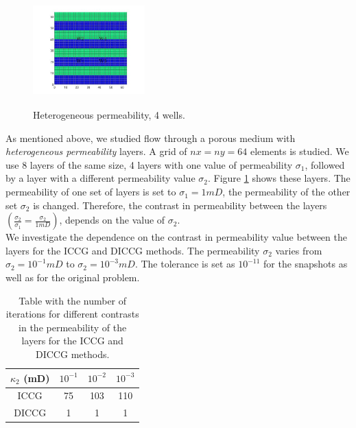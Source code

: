 \documentclass[12pt]{article}
\begin{document}
\begin{figure}
\centering 
\vspace{-10pt}
\includegraphics[width=4.3cm,height=4.3cm,keepaspectratio]{perm_he_1.jpg}
 \vspace{-20pt}
\caption{ Heterogeneous permeability, 4 wells.}\label{fig:hep}
\vspace{-15pt}
\end{figure}

\normalsize
As mentioned above, we studied flow through a porous medium with \emph{heterogeneous permeability} layers. A grid of
$nx = ny = 64$ elements is studied. We use 8 layers of the same size, 
4 layers with one value of permeability $\sigma_1$, followed by a layer with a different permeability value $\sigma_2$. Figure \ref{fig:hep} shows these layers. The permeability of one set of layers is set to $\sigma_1=1mD$, the permeability of the other set $\sigma_2$ is changed. 
Therefore, the contrast in permeability between the layers $(\frac{\sigma_2}{\sigma_1}=\frac{\sigma_2}{1mD})$,
depends on the value of $\sigma_2$.\\
We investigate the dependence on the contrast in permeability value between the layers for the ICCG and DICCG methods.
The permeability  $\sigma_2$ varies from $\sigma_2=10^{-1}mD$ to $\sigma_2=10^{-3}mD$. 
 The tolerance is set as $10^{-11}$ for the snapshots as well as for the original problem.\\
\renewcommand{\arraystretch}{1.3}
\begin{table}[!ht]\centering
\begin{minipage}{.65\textwidth}
\vspace{-20pt}
\centering
\begin{tabular}{ |c|c|c|c|} 
\hline
 $\kappa_2$ (mD) & $10^{-1}$& $10^{-2}$ & $10^{-3}$ \\
 \hline
  ICCG  & 75& 103&110\\ 
 
  DICCG  & 1 & 1& 1\\ 
 \hline
\end{tabular}
\caption{Table with the number of iterations for different contrasts in the permeability of the layers
for the ICCG and DICCG methods.}
\label{table:he}\end{minipage}
\vspace{-10pt}
\end{table}
\end{document}
